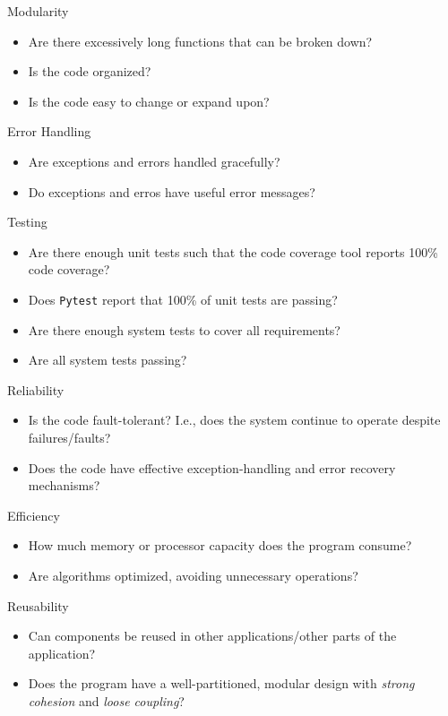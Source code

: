 \documentclass[12pt, titlepage]{article}
\begin{document}
\noindent
Modularity
\begin{itemize}[label=$\square$]
  \item Are there excessively long functions that can be broken down?
  \item Is the code organized? 
  \item Is the code easy to change or expand upon?
\end{itemize}

\noindent
Error Handling
\begin{itemize}[label=$\square$]
  \item Are exceptions and errors handled gracefully?
  \item Do exceptions and erros have useful error messages? 
\end{itemize}

\noindent
Testing
\begin{itemize}[label=$\square$]
  \item Are there enough unit tests such that the code coverage tool reports 100\% code coverage?
  \item Does \texttt{Pytest} report that 100\% of unit tests are passing? 
  \item Are there enough system tests to cover all requirements? 
  \item Are all system tests passing? 
\end{itemize}

\noindent
Reliability
\begin{itemize}[label=$\square$]
  \item Is the code fault-tolerant? I.e., does the system continue to operate despite failures/faults?
  \item Does the code have effective exception-handling and error recovery mechanisms?
\end{itemize}

\noindent
Efficiency
\begin{itemize}[label=$\square$]
  \item How much memory or processor capacity does the program consume?
  \item Are algorithms optimized, avoiding unnecessary operations?
\end{itemize}

\noindent
Reusability
\begin{itemize}[label=$\square$]
  \item Can components be reused in other applications/other parts of the application?
  \item Does the program have a well-partitioned, modular design with \emph{strong cohesion} and \emph{loose coupling}?
\end{itemize}
\end{document}
